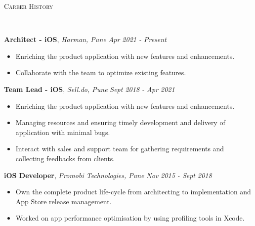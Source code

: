 \documentclass[9pt]{article}
\newenvironment{changemargin}[2]{%
  \begin{list}{}{%
    \setlength{\topsep}{0pt}%
    \setlength{\leftmargin}{#1}%
    \setlength{\rightmargin}{#2}%
    \setlength{\listparindent}{\parindent}%
    \setlength{\itemindent}{\parindent}%
    \setlength{\parsep}{\parskip}%
  }%
  \item[]}{\end{list}
}
\newcommand{\lineover}{
    \begin{changemargin}{-0.05in}{-0.05in}
        \vspace*{-8pt}
        \hrulefill \\
        \vspace*{-2pt}
    \end{changemargin}
}
\newcommand{\header}[1]{
    \begin{changemargin}{-0.5in}{-0.5in}
        \scshape{#1}\\
    \lineover
    \end{changemargin}
}
\newenvironment{body} {
    \vspace*{-16pt}
    \begin{changemargin}{-0.25in}{-0.5in}
  }
    {\end{changemargin}
}
\begin{document}
\header{Career History}

\begin{body}
    \vspace{14pt}
    \textbf{Architect - iOS}, \emph{Harman, Pune} \hfill \emph{Apr 2021 - Present}\\
    \begin{itemize} \itemsep -0pt  %
        \item Enriching the product application with new features and enhancements.
    \end{itemize}
    \begin{itemize} \itemsep -0pt  %
        \item Collaborate with the team to optimize existing features.
    \end{itemize}
    
    \vspace{14pt}
    \textbf{Team Lead - iOS}, \emph{Sell.do, Pune} \hfill \emph{Sept 2018 - Apr 2021}\\
    \begin{itemize} \itemsep -0pt  %
        \item Enriching the product application with new features and enhancements.
    \end{itemize}
    \begin{itemize} \itemsep -0pt  %
        \item Managing resources and ensuring timely development and delivery of application with minimal bugs.
    \end{itemize}
    \begin{itemize} \itemsep -0pt  %
        \item Interact with sales and support team for gathering requirements and collecting feedbacks from clients.
    \end{itemize}
    \vspace*{-4pt}

    \vspace{14pt}
    \textbf{iOS Developer}, \emph{Promobi Technologies, Pune} \hfill \emph{Nov 2015 - Sept 2018}\\
    \begin{itemize} \itemsep -0pt  %
        \item Own the complete product life-cycle from architecting to implementation and App Store release management.
    \end{itemize}
    \begin{itemize} \itemsep -0pt  %
        \item Worked on app performance optimisation by using profiling tools in Xcode.
    \end{itemize}
    \vspace*{-4pt}


\end{body}
\end{document}
